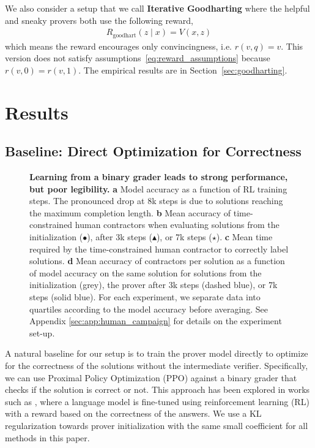 \documentclass{article}
\begin{document}
We also consider a setup that we call \textbf{Iterative Goodharting} where the helpful and sneaky provers both use the following reward, 
\begin{align}
    \label{eq:goodhart_reward}
    R_{\text{goodhart}}(z \mid x) =
      V(x,z) 
\end{align} which means the reward encourages only convincingness, i.e. $r(v, q)=v$. This version does not satisfy assumptions~\eqref{eq:reward_assumptions} because $r(v, 0)=r(v, 1)$. The empirical results are in Section~\ref{sec:goodharting}.


\section{Results}
\subsection{Baseline: Direct Optimization for Correctness}
\label{sec:correctness_only}
\begin{figure}
    \centering
    \caption{\textbf{Learning from a binary grader leads to strong performance, but poor legibility.} \textbf{a} Model accuracy as a function of RL training steps. The pronounced drop at 8k steps is due to solutions reaching the maximum completion length. \textbf{b} Mean accuracy of time-constrained human contractors when evaluating solutions from the initialization ($\bullet$), after 3k steps ($\blacktriangle$), or 7k steps ($\star$). \textbf{c} Mean time required by the time-constrained human contractor to correctly label solutions. \textbf{d} Mean accuracy of contractors per solution as a function of model accuracy on the same solution for solutions from the initialization (grey), the prover after 3k steps (dashed blue), or 7k steps (solid blue). For each experiment, we separate data into quartiles according to the model accuracy before averaging. See Appendix \ref{sec:app:human_campaign} for details on the experiment set-up.}
    \label{fig:correctness-only}
\end{figure}

A natural baseline for our setup is to train the prover model directly to optimize for the correctness of the solutions without the intermediate verifier. Specifically, we can use Proximal Policy Optimization (PPO) against a binary grader that checks if the solution is correct or not. This approach has been explored in works such as \cite{havrilla2024teaching}, where a language model is fine-tuned using reinforcement learning (RL) with a reward based on the correctness of the answers. We use a KL regularization towards prover initialization with the same small coefficient for all methods in this paper.
\end{document}
